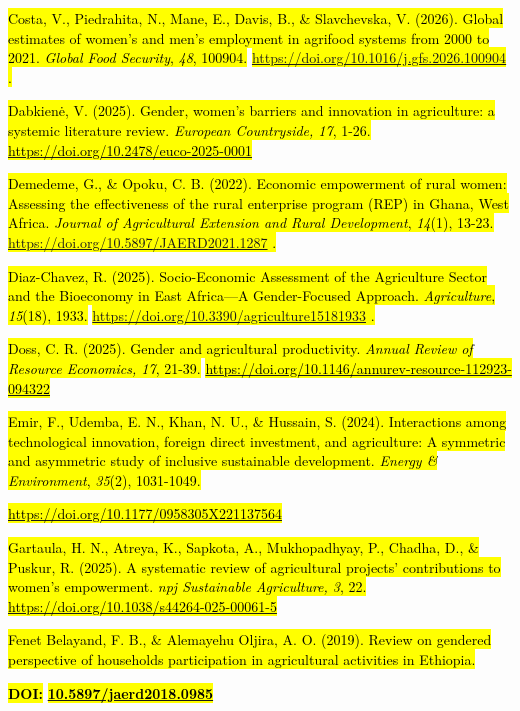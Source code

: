 \documentclass[
]{article}
\begin{document}
\hl{Costa, V., Piedrahita, N., Mane, E., Davis, B., \& Slavchevska, V.
(2026). Global estimates of women's and men's employment in agrifood
systems from 2000 to 2021. \emph{Global Food Security}, \emph{48},
100904.} \hl{\mbox{\url{https://doi.org/10.1016/j.gfs.2026.100904}} .}

\hl{Dabkienė, V. (2025). Gender, women's barriers and innovation in
agriculture: a systemic literature review. \emph{European Countryside,
17}, 1-26.}
\href{https://doi.org/10.2478/euco-2025-0001}{\hl{https://doi.org/10.2478/euco-2025-0001}}

\hl{Demedeme, G., \& Opoku, C. B. (2022). Economic empowerment of rural
women: Assessing the effectiveness of the rural enterprise program (REP)
in Ghana, West Africa. \emph{Journal of Agricultural Extension and Rural
Development}, \emph{14}(1), 13-23.}
\hl{\mbox{\url{https://doi.org/10.5897/JAERD2021.1287}} .}

\hl{Diaz-Chavez, R. (2025). Socio-Economic Assessment of the Agriculture
Sector and the Bioeconomy in East Africa---A Gender-Focused Approach.
\emph{Agriculture}, \emph{15}(18), 1933.}
\hl{\mbox{\url{https://doi.org/10.3390/agriculture15181933}} .}

\hl{Doss, C. R. (2025). Gender and agricultural productivity.
\emph{Annual Review of Resource Economics, 17}, 21-39.}
\href{https://doi.org/10.1146/annurev-resource-112923-094322}{\hl{https://doi.org/10.1146/annurev-resource-112923-094322}}

\hl{Emir, F., Udemba, E. N., Khan, N. U., \& Hussain, S. (2024).
Interactions among technological innovation, foreign direct investment,
and agriculture: A symmetric and asymmetric study of inclusive
sustainable development. \emph{Energy \& Environment}, \emph{35}(2),
1031-1049.}

\href{https://doi.org/10.1177/0958305X221137564}{\hl{https://doi.org/10.1177/0958305X221137564}}

\hl{Gartaula, H. N., Atreya, K., Sapkota, A., Mukhopadhyay, P., Chadha,
D., \& Puskur, R. (2025). A systematic review of agricultural projects'
contributions to women's empowerment. \emph{npj Sustainable Agriculture,
3}, 22.}
\href{https://doi.org/10.1038/s44264-025-00061-5}{\hl{https://doi.org/10.1038/s44264-025-00061-5}}

\hl{Fenet Belayand, F. B., \& Alemayehu Oljira, A. O. (2019). Review on
gendered perspective of household\textquotesingle s participation in
agricultural activities in Ethiopia.}

\textbf{\hl{DOI:}}
\href{https://doi.org/10.5897/jaerd2018.0985}{\textbf{\hl{10.5897/jaerd2018.0985}}}
\end{document}
